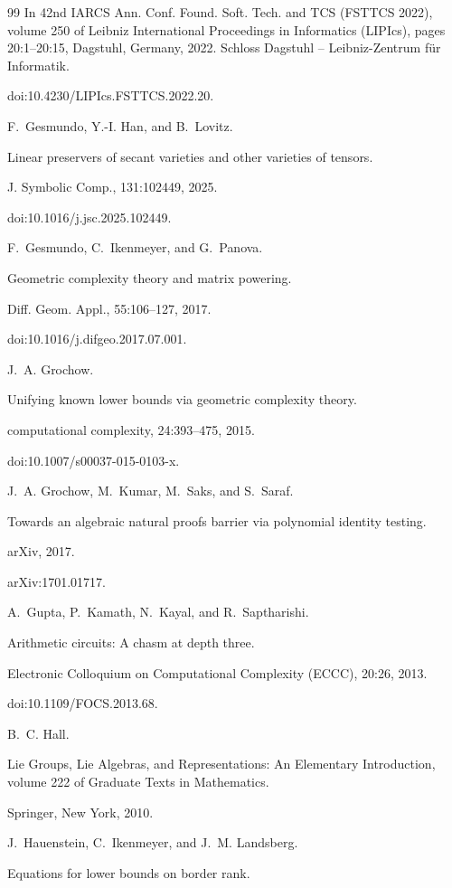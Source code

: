 \documentclass[10pt,a4paper]{article}
\begin{document}
\begin{thebibliography}{99}
In 42nd IARCS Ann. Conf. Found. Soft. Tech. and TCS (FSTTCS
2022), volume 250 of Leibniz International Proceedings in Informatics
(LIPIcs), pages 20:1–20:15, Dagstuhl, Germany, 2022. Schloss Dagstuhl –
Leibniz-Zentrum für Informatik.


doi:10.4230/LIPIcs.FSTTCS.2022.20.

F. Gesmundo, Y.-I. Han, and B. Lovitz.


Linear preservers of secant varieties and other varieties of
tensors.


J. Symbolic Comp., 131:102449, 2025.


doi:10.1016/j.jsc.2025.102449.

F. Gesmundo, C. Ikenmeyer, and G. Panova.


Geometric complexity theory and matrix powering.


Diff. Geom. Appl., 55:106–127, 2017.


doi:10.1016/j.difgeo.2017.07.001.

J. A. Grochow.


Unifying known lower bounds via geometric complexity theory.


computational complexity, 24:393–475, 2015.


doi:10.1007/s00037-015-0103-x.

J. A. Grochow, M. Kumar, M. Saks, and S. Saraf.


Towards an algebraic natural proofs barrier via polynomial identity
testing.


arXiv, 2017.


arXiv:1701.01717.

A. Gupta, P. Kamath, N. Kayal, and R. Saptharishi.


Arithmetic circuits: A chasm at depth three.


Electronic Colloquium on Computational Complexity (ECCC),
20:26, 2013.


doi:10.1109/FOCS.2013.68.

B. C. Hall.


Lie Groups, Lie Algebras, and Representations: An
Elementary Introduction, volume 222 of Graduate Texts in
Mathematics.


Springer, New York, 2010.

J. Hauenstein, C. Ikenmeyer, and J. M. Landsberg.


Equations for lower bounds on border rank.



\end{thebibliography}
\end{document}
